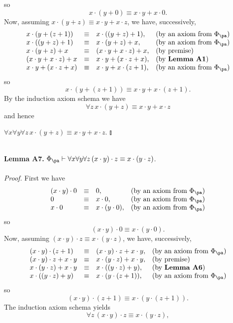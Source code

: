 so
\[
x \cdot (y + 0) \equiv x \cdot y + x \cdot 0.
\]
Now, assuming $x \cdot (y + z) \equiv x \cdot y + x \cdot z$, we have, successively,
\[
\begin{array}{llll}
x \cdot (y + (z + 1)) & \equiv & x \cdot ((y + z) + 1), & \mbox{(by an axiom from $\Phi_\pa$)}\cr
x \cdot ((y + z) + 1) & \equiv & x \cdot (y + z) + x, & \mbox{(by an axiom from $\Phi_\pa$)}\cr
x \cdot (y + z) + x & \equiv & (x \cdot y + x \cdot z) + x, & \mbox{(by premise)}\cr
(x \cdot y + x \cdot z) + x & \equiv & x \cdot y + (x \cdot z + x), & \mbox{(by \textbf{Lemma A1})}\cr
x \cdot y + (x \cdot z + x) & \equiv & x \cdot y + x \cdot (z + 1), & \mbox{(by an axiom from $\Phi_\pa$)}
\end{array}
\]
so
\[
x \cdot (y + (z + 1)) \equiv x \cdot y + x \cdot (z + 1).
\]
By the induction axiom schema we have
\[
\forall z \, x \cdot (y + z) \equiv x \cdot y + x \cdot z
\]
and hence
\begin{center}
\phantom{$\talloblong$} \hfill $\forall x \forall y \forall z \, x \cdot (y + z) \equiv x \cdot y + x \cdot z.$ \hfill $\talloblong$
\end{center}
\ \\
\textbf{Lemma A7.} $\Phi_\pa \vdash \forall x \forall y \forall z \, (x \cdot y) \cdot z \equiv x \cdot (y \cdot z)$.\\
\ \\
\textit{Proof.} First we have
\[
\begin{array}{llll}
(x \cdot y) \cdot 0 & \equiv & 0, & \mbox{(by an axiom from $\Phi_\pa$)}\cr
0 & \equiv & x \cdot 0, & \mbox{(by an axiom from $\Phi_\pa$)}\cr
x \cdot 0 & \equiv & x \cdot (y \cdot 0), & \mbox{(by an axiom from $\Phi_\pa$)}
\end{array}
\]
so
\[
(x \cdot y) \cdot 0 \equiv x \cdot (y \cdot 0).
\]
Now, assuming $(x \cdot y) \cdot z \equiv x \cdot (y \cdot z)$, we have, successively,
\[
\begin{array}{llll}
(x \cdot y) \cdot (z + 1) & \equiv & (x \cdot y) \cdot z + x \cdot y, & \mbox{(by an axiom from $\Phi_\pa$)}\cr
(x \cdot y) \cdot z + x \cdot y & \equiv & x \cdot (y \cdot z) + x \cdot y, & \mbox{(by premise)}\cr
x \cdot (y \cdot z) + x \cdot y & \equiv & x \cdot ((y \cdot z) + y), & \mbox{(by \textbf{Lemma A6})}\cr
x \cdot ((y \cdot z) + y) & \equiv & x \cdot (y \cdot (z + 1)), & \mbox{(by an axiom from $\Phi_\pa$)}
\end{array}
\]
so
\[
(x \cdot y) \cdot (z + 1) \equiv x \cdot (y \cdot (z + 1)).
\]
The induction axiom schema yields
\[
\forall z \, (x \cdot y) \cdot z \equiv x \cdot (y \cdot z),
\]
